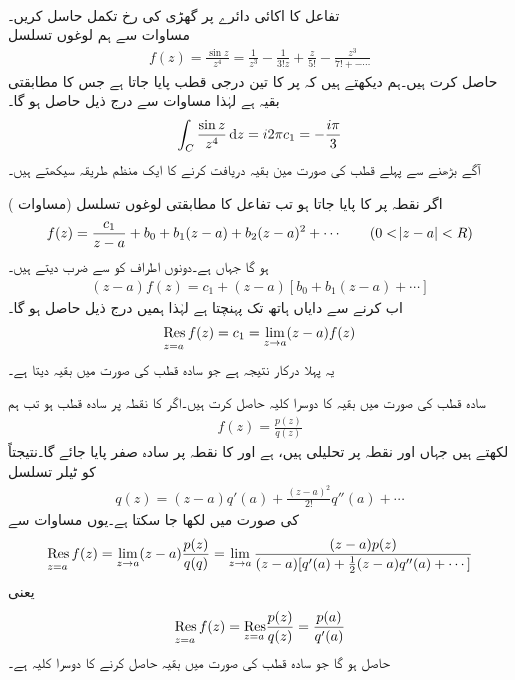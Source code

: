 \quad {}\\
تفاعل  کا اکائی دائرے پر گھڑی کی رخ تکمل حاسل کریں۔\\
مساوات  سے ہم لوغوں تسلسل
\begin{align*}
f(z)=\frac{\sin z}{z^4}=\frac{1}{z^3}-\frac{1}{3!z}+\frac{z}{5!}-\frac{z^3}{7!+-\cdots}
\end{align*}
حاصل کرت ہیں۔ہم دیکھتے ہیں کہ  پر  کا تین درجی قطب پایا جاتا ہے جس کا مطابقتی بقیہ  ہے لہٰذا مساوات  سے درج ذیل حاصل ہو گا۔
\begin{align*}
\int_C \frac{\sin z}{z^4}\dif z=i2\pi c_1=-\frac{i\pi}{3}
\end{align*}
آگے بڑھنے سے پہلے قطب کی صورت مین بقیہ دریافت کرنے کا ایک منظم طریقہ سیکھتے ہیں۔

اگر نقطہ  پر  کا  پایا جاتا ہو تب تفاعل کا مطابقتی لوغوں تسلسل (مساوات ) 
\begin{align*}
f(z)=\frac{c_1}{z-a}+b_0+b_1(z-a)+b_2(z-a)^2+\cdots\quad \quad (0<\abs{z-a}<R)
\end{align*}
ہو گا جہاں  ہے۔دونوں اطراف کو  سے ضرب دیتے ہیں۔
\begin{align}
(z-a)f(z)=c_1+(z-a)[b_0+b_1(z-a)+\cdots]
\end{align}
اب  کرنے سے دایاں ہاتھ  تک پہنچتا ہے لہٰذا ہمیں درج ذیل حاصل ہو گا۔
\begin{align}\label{مساوات_بقیہ_پہلا_کلیہ}
\underset{z=a\hfill}{\Res f(z)}=c_1=\lim_{z\to a} (z-a)f(z)
\end{align}  
یہ پہلا درکار نتیجہ ہے جو سادہ قطب کی صورت میں بقیہ دیتا ہے۔

سادہ قطب کی صورت میں بقیہ کا دوسرا کلیہ حاصل کرت ہیں۔اگر  کا نقطہ  پر سادہ قطب ہو تب ہم
\begin{align*}
 f(z)=\tfrac{p(z)}{q(z)}
\end{align*}
 لکھتے ہیں جہاں  اور  نقطہ  پر تحلیلی ہیں،  ہے اور  کا نقطہ  پر سادہ صفر پایا جائے گا۔نتیجتاً  کو ٹیلر تسلسل
\begin{align*}
q(z)=(z-a)q'(a)+\frac{(z-a)^2}{2!}q''(a)+\cdots
\end{align*}
کی صورت میں لکھا جا سکتا ہے۔یوں مساوات   سے 
\begin{align*}
\underset{z=a\hfill}{\Res f(z)}=\lim_{z\to a} (z-a)\frac{p(z)}{q(q)}=\lim_{z\to a}\frac{(z-a)p(z)}{(z-a)[q'(a)+\tfrac{1}{2}(z-a)q''(a)+\cdots]}
\end{align*}
یعنی 
\begin{align}\label{مساوات_بقیہ_دوسرا_کلیہ}
\underset{z=a\hfill}{\Res f(z)}=\underset{z=a\hfill}{\Res} \frac{p(z)}{q(z)}=\frac{p(a)}{q'(a)}
\end{align}
حاصل ہو گا جو سادہ قطب کی صورت میں بقیہ حاصل کرنے کا دوسرا کلیہ ہے۔

